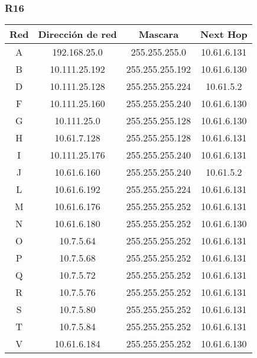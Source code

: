 \subsubsection{R16}
\begin{table}[!htbp]
\centering
  \begin{tabular}{|c|c|c|c|}
    \hline
	Red & Dirección de red & Mascara & Next Hop\\ \hline
	A & 192.168.25.0 & 255.255.255.0 & 10.61.6.131 \\ \hline
	B & 10.111.25.192 & 255.255.255.192 & 10.61.6.130 \\ \hline
	D & 10.111.25.128 & 255.255.255.224 & 10.61.5.2 \\ \hline
	F & 10.111.25.160 & 255.255.255.240 & 10.61.6.130 \\ \hline
	G & 10.111.25.0 & 255.255.255.128 & 10.61.6.130 \\ \hline
	H & 10.61.7.128 & 255.255.255.128 & 10.61.6.131 \\ \hline	
	I & 10.111.25.176 & 255.255.255.240 & 10.61.6.131 \\ \hline
	J & 10.61.6.160 & 255.255.255.240 & 10.61.5.2 \\ \hline
	L & 10.61.6.192 & 255.255.255.224 & 10.61.6.131 \\ \hline
	M & 10.61.6.176 & 255.255.255.252 & 10.61.6.131 \\ \hline
	N & 10.61.6.180 & 255.255.255.252 & 10.61.6.130 \\ \hline
	O & 10.7.5.64 & 255.255.255.252 & 10.61.6.131 \\ \hline
	P & 10.7.5.68 & 255.255.255.252 & 10.61.6.131 \\ \hline
	Q & 10.7.5.72 & 255.255.255.252 & 10.61.6.131 \\ \hline
	R & 10.7.5.76 & 255.255.255.252 & 10.61.6.131 \\ \hline
	S & 10.7.5.80 & 255.255.255.252 & 10.61.6.131 \\ \hline
	T & 10.7.5.84 & 255.255.255.252 & 10.61.6.131 \\ \hline
	V & 10.61.6.184 & 255.255.255.252 & 10.61.6.130 \\
    \hline
  \end{tabular}
\end{table}

\newpage
